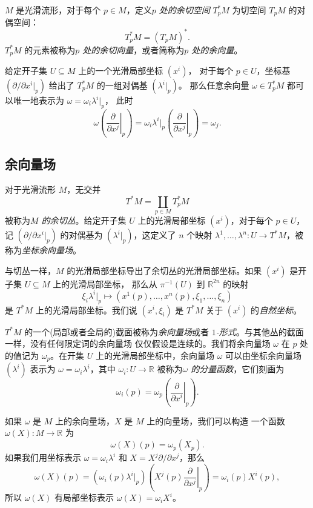 \documentclass[fontset=none]{Notes}
\begin{document}
$M$ 是光滑流形，对于每个 $p\in M$，定义\emph{$p$ 处的余切空间}
$T_p^*M$ 为切空间 $T_pM$ 的对偶空间：
\[
  T_p^*M=(T_pM)^*.  
\]
$T_p^*M$ 的元素被称为\emph{$p$ 处的余切向量}，或者简称为\emph{$p$ 处的余向量}。

给定开子集 $U\subseteq M$ 上的一个光滑局部坐标 $\left(x^i\right)$，
对于每个 $p\in U$，坐标基 $\left(\partial /\partial x^i|_p\right)$
给出了 $T_p^*M$ 的一组对偶基 $\left(\lambda^i|_p\right)$。
那么任意余向量 $\omega\in T_p^*M$ 都可以唯一地表示为 $\omega=\omega_i\lambda^i|_p$，
此时
\[
  \omega\left(\left.\frac{\partial}{\partial x^j}\right|_p\right)=\omega_i  
  \lambda^i|_p\left(\left.\frac{\partial}{\partial x^j}\right|_p\right)
  =\omega_j.
\]

\subsection{余向量场}

对于光滑流形 $M$，无交并
\[
  T^*M=\coprod_{p\in M}T_p^*M  
\]
被称为\emph{$M$ 的余切丛}。给定开子集 $U$ 上的光滑局部坐标
$\left(x^i\right)$，对于每个 $p\in U$，记 $\left(\partial/\partial x^i|_p\right)$
的对偶基为 $\left(\lambda^i|_p\right)$，这定义了 $n$ 个映射
$\lambda^1,\dots,\lambda^n:U\to T^*M$，被称为\emph{坐标余向量场}。

与切丛一样，$M$ 的光滑局部坐标导出了余切丛的光滑局部坐标。如果 
$\left(x^i\right)$ 是开子集 $U\subseteq M$ 上的光滑局部坐标，
那么从 $\pi^{-1}(U)$ 到 $\mathbb{R}^{2n}$ 的映射
\[
  \xi_i\lambda^i|_p \mapsto 
  \left(x^1(p),\dots,x^n(p),\xi_1,\dots,\xi_n\right)
\]
是 $T^*M$ 上的光滑局部坐标。我们说 $\left(x^i,\xi_i\right)$ 是
$T^*M$ 关于 $\left(x^i\right)$ 的\emph{自然坐标}。

$T^*M$ 的一个(局部或者全局的)截面被称为\emph{余向量场}或者
\emph{$1$-形式}。与其他丛的截面一样，没有任何限定词的余向量场
仅仅假设是连续的。我们将余向量场 $\omega$ 在 $p$ 处的值记为
$\omega_p$。在开集 $U$ 上的光滑局部坐标中，余向量场 $\omega$
可以由坐标余向量场 $\left(\lambda^i\right)$ 表示为
$\omega=\omega_i\lambda^i$，其中 $\omega_i:U\to \mathbb{R}$
被称为\emph{$\omega$ 的分量函数}，它们刻画为
\[
  \omega_i(p)=\omega_p\left(\left.\frac{\partial}{\partial x^i}\right|_p\right).  
\]

如果 $\omega$ 是 $M$ 上的余向量场，$X$ 是 $M$ 上的向量场，我们可以构造
一个函数 $\omega(X):M\to \mathbb{R}$ 为
\[
  \omega(X)(p)=\omega_p(X_p).  
\]
如果我们用坐标表示 $\omega=\omega_i\lambda^i$ 和 $X=X^j\partial/\partial x^j$，那么
\[
  \omega(X)(p)=\left(\omega_i(p)\lambda^i|_p\right) 
  \left(X^j(p)\left.\frac{\partial}{\partial x^j}\right|_p\right)
  =\omega_i(p)X^i(p),
\]
所以 $\omega(X)$ 有局部坐标表示 $\omega(X)=\omega_iX^i$。
\end{document}
